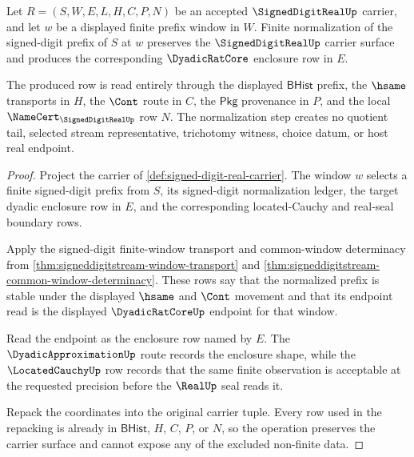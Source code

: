 \begin{theorem}
\label{thm:signed-digit-real-normalization-window}
Let $R=(S,W,E,L,H,C,P,N)$ be an accepted $\SignedDigitRealUp$ carrier, and let $w$ be a displayed finite prefix window in $W$. Finite normalization of the signed-digit prefix of $S$ at $w$ preserves the $\SignedDigitRealUp$ carrier surface and produces the corresponding $\DyadicRatCore$ enclosure row in $E$.

The produced row is read entirely through the displayed $\mathsf{BHist}$ prefix, the $\hsame$ transports in $H$, the $\Cont$ route in $C$, the $\mathsf{Pkg}$ provenance in $P$, and the local $\NameCert_{\SignedDigitRealUp}$ row $N$. The normalization step creates no quotient tail, selected stream representative, trichotomy witness, choice datum, or host real endpoint.
\end{theorem}
\begin{proof}
Project the carrier of \autoref{def:signed-digit-real-carrier}. The window $w$ selects a finite signed-digit prefix from $S$, its signed-digit normalization ledger, the target dyadic enclosure row in $E$, and the corresponding located-Cauchy and real-seal boundary rows.

Apply the signed-digit finite-window transport and common-window determinacy from \autoref{thm:signeddigitstream-window-transport} and \autoref{thm:signeddigitstream-common-window-determinacy}. These rows say that the normalized prefix is stable under the displayed $\hsame$ and $\Cont$ movement and that its endpoint read is the displayed $\DyadicRatCoreUp$ endpoint for that window.

Read the endpoint as the enclosure row named by $E$. The $\DyadicApproximationUp$ route records the enclosure shape, while the $\LocatedCauchyUp$ row records that the same finite observation is acceptable at the requested precision before the $\RealUp$ seal reads it.

Repack the coordinates into the original carrier tuple. Every row used in the repacking is already in $\mathsf{BHist}$, $H$, $C$, $P$, or $N$, so the operation preserves the carrier surface and cannot expose any of the excluded non-finite data.
\end{proof}

